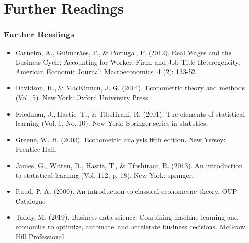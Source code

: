 \documentclass[
  shownotes,
  xcolor={svgnames},
  hyperref={colorlinks,citecolor=DarkBlue,linkcolor=DarkRed,urlcolor=DarkBlue}
  ]{beamer}
\begin{document}
\section{Further Readings}
\begin{frame}
\frametitle{Further Readings}
\footnotesize
\begin{itemize}
  \item Carneiro, A., Guimarães, P., \& Portugal, P. (2012). Real Wages and the Business Cycle: Accounting for Worker, Firm, and Job Title Heterogeneity. American Economic Journal: Macroeconomics, 4 (2): 133-52. 
  \medskip
  \item Davidson, R., \& MacKinnon, J. G. (2004). Econometric theory and methods (Vol. 5). New York: Oxford University Press.
  \medskip
  \item Friedman, J., Hastie, T., \& Tibshirani, R. (2001). The elements of statistical learning (Vol. 1, No. 10). New York: Springer series in statistics.
  \medskip
  \item Greene, W. H. (2003). Econometric analysis fifth edition. New Yersey: Prentice Hall.
  \medskip
  \item James, G., Witten, D., Hastie, T., \& Tibshirani, R. (2013). An introduction to statistical learning (Vol. 112, p. 18). New York: springer.
  \medskip
  \item Ruud, P. A. (2000). An introduction to classical econometric theory. OUP Catalogue
  \medskip
  \item Taddy, M. (2019). Business data science: Combining machine learning and economics to optimize, automate, and accelerate business decisions. McGraw Hill Professional.


\end{itemize}

\end{frame}
\end{document}
